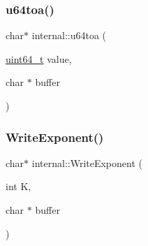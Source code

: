 \subsubsection{\texorpdfstring{u64toa()}{u64toa()}}
{\footnotesize\ttfamily char$\ast$ internal\+::u64toa (\begin{DoxyParamCaption}\item[{\hyperlink{stdint_8h_aec6fcb673ff035718c238c8c9d544c47}{uint64\+\_\+t}}]{value,  }\item[{char $\ast$}]{buffer }\end{DoxyParamCaption})\hspace{0.3cm}{\ttfamily [inline]}}

\mbox{\label{namespaceinternal_acc9a114f2a03bb4c68e9ee99b9ca99c5}} 
\subsubsection{\texorpdfstring{Write\+Exponent()}{WriteExponent()}}
{\footnotesize\ttfamily char$\ast$ internal\+::\+Write\+Exponent (\begin{DoxyParamCaption}\item[{int}]{K,  }\item[{char $\ast$}]{buffer }\end{DoxyParamCaption})\hspace{0.3cm}{\ttfamily [inline]}}

